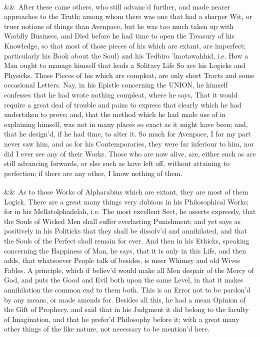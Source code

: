 \documentclass[12pt]{article}
\newcommand{\para}[1][]{\par\noindent\ifx&#1&\else\textsuperscript{\footnotesize #1}~\fi}
\begin{document}
\para After these came others, who still advanc'd further, and made nearer approaches to the Truth; among whom there was one that had a sharper Wit, or truer notions of things than Avenpace, but he was too much taken up with Worldly Business, and Died before he had time to open the Treasury of his Knowledge, so that most of those pieces of his which are extant, are imperfect; particularly his Book about the Soul) and his Tedbiro 'lmotawahhid, i.e. How a Man ought to manage himself that leads a Solitary Life So are his Logicks and Physicks. Those Pieces of his which are compleat, are only short Tracts and some occasional Letters. Nay, in his Epistle concerning the UNION, he himself confesses that he had wrote nothing compleat, where he says, That it would require a great deal of trouble and pains to express that clearly which he had undertaken to prove; and, that the method which he had made use of in explaining himself, was not in many places so exact as it might have been; and, that he design'd, if he had time, to alter it. So much for Avenpace, I for my part never saw him, and as for his Contemporaries, they were far inferiour to him, nor did I ever see any of their Works. Those who are now alive, are, either such as are still advancing forwards, or else such as have left off, without attaining to perfection; if there are any other, I know nothing of them.

\para As to those Works of Alpharabius which are extant, they are most of them Logick. There are a great many things very dubious in his Philosophical Works; for in his Mellatolphadelah, i.e. The most excellent Sect, he asserts expressly, that the Souls of Wicked Men shall suffer everlasting Punishment; and yet says as positively in his Politicks that they shall be dissolv'd and annihilated, and that the Souls of the Perfect shall remain for ever. And then in his Ethicks, speaking concerning the Happiness of Man, he says, that it is only in this Life, and then adds, that whatsoever People talk of besides, is meer Whimsy and old Wives Fables. A principle, which if believ'd would make all Men despair of the Mercy of God, and puts the Good and Evil both upon the same Level, in that it makes annihilation the common end to them both. This is an Error not to be pardon'd by any means, or made amends for. Besides all this, he had a mean Opinion of the Gift of Prophecy, and said that in his Judgment it did belong to the faculty of Imagination, and that he prefer'd Philosophy before it; with a great many other things of the like nature, not necessary to be mention'd here.
\end{document}
